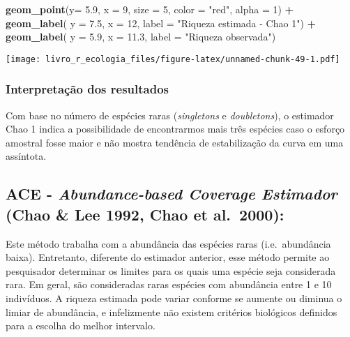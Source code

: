 \documentclass[
]{book}
\newenvironment{Shaded}{\begin{snugshade}}{\end{snugshade}}
\newcommand{\DataTypeTok}[1]{\textcolor[rgb]{0.13,0.29,0.53}{#1}}
\newcommand{\DecValTok}[1]{\textcolor[rgb]{0.00,0.00,0.81}{#1}}
\newcommand{\FloatTok}[1]{\textcolor[rgb]{0.00,0.00,0.81}{#1}}
\newcommand{\KeywordTok}[1]{\textcolor[rgb]{0.13,0.29,0.53}{\textbf{#1}}}
\newcommand{\NormalTok}[1]{#1}
\newcommand{\OperatorTok}[1]{\textcolor[rgb]{0.81,0.36,0.00}{\textbf{#1}}}
\newcommand{\StringTok}[1]{\textcolor[rgb]{0.31,0.60,0.02}{#1}}
\begin{document}
\begin{Shaded}
\begin{Highlighting}[]
\StringTok{  }\KeywordTok{geom_point}\NormalTok{(}\DataTypeTok{y=} \FloatTok{5.9}\NormalTok{, }\DataTypeTok{x =} \DecValTok{9}\NormalTok{, }\DataTypeTok{size =} \DecValTok{5}\NormalTok{, }\DataTypeTok{color =} \StringTok{"red"}\NormalTok{, }\DataTypeTok{alpha =} \DecValTok{1}\NormalTok{) }\OperatorTok{+}\StringTok{ }
\StringTok{  }\KeywordTok{geom_label}\NormalTok{( }\DataTypeTok{y =} \FloatTok{7.5}\NormalTok{, }\DataTypeTok{x =} \DecValTok{12}\NormalTok{, }\DataTypeTok{label =} \StringTok{"Riqueza estimada - Chao 1"}\NormalTok{) }\OperatorTok{+}
\StringTok{  }\KeywordTok{geom_label}\NormalTok{( }\DataTypeTok{y =} \FloatTok{5.9}\NormalTok{, }\DataTypeTok{x =} \FloatTok{11.3}\NormalTok{, }\DataTypeTok{label =} \StringTok{"Riqueza observada"}\NormalTok{)}
\end{Highlighting}
\end{Shaded}

\texttt{[image: livro\_r\_ecologia\_files/figure-latex/unnamed-chunk-49-1.pdf]}

\hypertarget{interpretauxe7uxe3o-dos-resultados}{%
\subsubsection{Interpretação dos resultados}\label{interpretauxe7uxe3o-dos-resultados}}

Com base no número de espécies raras (\emph{singletons} e \emph{doubletons}), o estimador Chao 1 indica a possibilidade de encontrarmos mais três espécies caso o esforço amostral fosse maior e não mostra tendência de estabilização da curva em uma assíntota.

\hypertarget{ace---abundance-based-coverage-estimador-chao-lee-1992-chao-et-al.-2000}{%
\subsection{\texorpdfstring{ACE - \emph{Abundance-based Coverage Estimador} (Chao \& Lee 1992, Chao et al.~2000):}{ACE - Abundance-based Coverage Estimador (Chao \& Lee 1992, Chao et al.~2000):}}\label{ace---abundance-based-coverage-estimador-chao-lee-1992-chao-et-al.-2000}}

Este método trabalha com a abundância das espécies raras (i.e.~abundância baixa). Entretanto, diferente do estimador anterior, esse método permite ao pesquisador determinar os limites para os quais uma espécie seja considerada rara. Em geral, são consideradas raras espécies com abundância entre 1 e 10 indivíduos. A riqueza estimada pode variar conforme se aumente ou diminua o limiar de abundância, e infelizmente não existem critérios biológicos definidos para a escolha do melhor intervalo.
\end{document}
